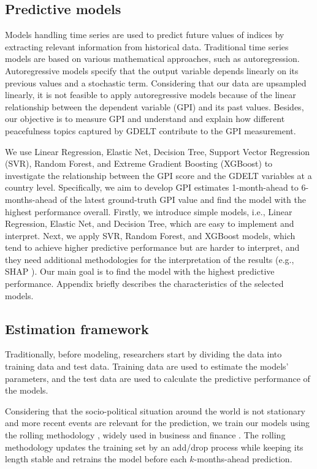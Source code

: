 \documentclass{bmcart}
\begin{document}
\subsection{Predictive models}
\label{section:prediction_models}

Models handling time series are used to predict future values of indices by extracting relevant information from historical data. Traditional time series models are based on various mathematical approaches, such as autoregression. 
Autoregressive models specify that the output variable depends linearly on its previous values and a stochastic term. Considering that our data are upsampled linearly, it is not feasible to apply autoregressive models because of the linear relationship between the dependent variable (GPI) and its past values. 
Besides, our objective is to measure GPI and understand and explain how different peacefulness topics captured by GDELT contribute to the GPI measurement.

We use Linear Regression, Elastic Net, Decision Tree, Support Vector Regression (SVR), Random Forest, and Extreme Gradient Boosting (XGBoost) to investigate the relationship between the GPI score and the GDELT variables at a country level.
Specifically, we aim to develop GPI estimates 1-month-ahead to 6-months-ahead of the latest ground-truth GPI value and find the model with the highest performance overall.
Firstly, we introduce simple models, i.e., Linear Regression, Elastic Net, and Decision Tree, which are easy to implement and interpret. Next, we apply SVR, Random Forest, and XGBoost models, which tend to achieve higher predictive performance but are harder to interpret, and they need additional methodologies for the interpretation of the results (e.g., SHAP \cite{lundberg2018consistent,lundberg2017unified}). Our main goal is to find the model with the highest predictive performance. Appendix  briefly describes the characteristics of the selected models.

\subsection{Estimation framework}
\label{rolling_training}

Traditionally, before modeling, researchers start by dividing the data into training data and test data. 
Training data are used to estimate the models' parameters, and the test data are used to calculate the predictive performance of the models.

Considering that the socio-political situation around the world is not stationary and more recent events are relevant for the prediction, we train our models using the rolling methodology \cite{hyndman2018forecasting}, widely used in business and finance \cite{zeller2013good}. 
The rolling methodology updates the training set by an add/drop process while keeping its length stable and retrains the model before each $k$-months-ahead prediction.
\end{document}
